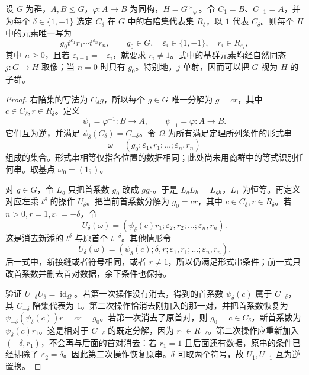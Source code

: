\begin{theorem}\label{b1:thm:hnn-normal-form}
	设 \(G\) 为群，\(A,B\le G\)，\(\varphi:A\rightarrow B\) 为同构，\(H=G*_{\varphi}\)。令 \(C_{1}=B\)、\(C_{-1}=A\)，并为每个 \(\delta\in\{1,-1\}\) 选定 \(C_\delta\) 在 \(G\) 中的右陪集代表集 \(R_\delta\)，以 \(1\) 代表 \(C_\delta\)。则每个 \(H\) 中的元素唯一写为
	\[
		g_0t^{\varepsilon_1}r_1\cdots t^{\varepsilon_n}r_n,
		\qquad g_0\in G,\quad\varepsilon_i\in\{1,-1\},\quad r_i\in R_{\varepsilon_i},
	\]
	其中 \(n\ge0\)，且若 \(\varepsilon_{i+1}=-\varepsilon_i\)，就要求 \(r_i\ne1\)。式中的基群元素均经自然同态 \(j:G\rightarrow H\) 取像；当 \(n=0\) 时只有 \(g_0\)。特别地，\(j\) 单射，因而可以把 \(G\) 视为 \(H\) 的子群。
\end{theorem}
\begin{proof}
	右陪集的写法为 \(C_\delta g\)，所以每个 \(g\in G\) 唯一分解为 \(g=cr\)，其中 \(c\in C_\delta,r\in R_\delta\)。定义
	\[
		\psi_1=\varphi^{-1}:B\longrightarrow A,\qquad
		\psi_{-1}=\varphi:A\longrightarrow B.
	\]
	它们互为逆，并满足 \(\psi_\delta(C_\delta)=C_{-\delta}\)。令 \(\Omega\) 为所有满足定理所列条件的形式串
	\[
		\omega=(g_0;\varepsilon_1,r_1;\ldots;\varepsilon_n,r_n)
	\]
	组成的集合。形式串相等仅指各位置的数据相同；此处尚未用商群中的等式识别任何串。取基点 \(\omega_0=(1;)\)。

	对 \(g\in G\)，令 \(L_g\) 只把首系数 \(g_0\) 改成 \(gg_0\)。于是 \(L_gL_h=L_{gh}\)，\(L_1\) 为恒等。再定义对应左乘 \(t^\delta\) 的操作 \(U_\delta\)。把当前首系数分解为 \(g_0=cr\)，其中 \(c\in C_\delta,r\in R_\delta\)。若 \(n>0,r=1,\varepsilon_1=-\delta\)，令
	\[
		U_\delta(\omega)
		=(\psi_\delta(c)r_1;\varepsilon_2,r_2;\ldots;\varepsilon_n,r_n).
	\]
	这是消去新添的 \(t^\delta\) 与原首个 \(t^{-\delta}\)。其他情形令
	\[
		U_\delta(\omega)
		=(\psi_\delta(c);\delta,r;\varepsilon_1,r_1;\ldots;\varepsilon_n,r_n).
	\]
	后一式中，新接缝或者符号相同，或者 \(r\ne1\)，所以仍满足形式串条件；前一式只改首系数并删去首对数据，余下条件也保持。

	验证 \(U_{-\delta}U_\delta=\operatorname{id}_\Omega\)。若第一次操作没有消去，得到的首系数 \(\psi_\delta(c)\) 属于 \(C_{-\delta}\)，其 \(C_{-\delta}\) 陪集代表为 \(1\)。第二次操作恰消去刚加入的那一对，并把首系数恢复为 \(\psi_{-\delta}(\psi_\delta(c))r=cr=g_0\)。若第一次消去了原首对，则 \(g_0=c\in C_\delta\)，新首系数为 \(\psi_\delta(c)r_1\)。这是相对于 \(C_{-\delta}\) 的既定分解，因为 \(r_1\in R_{-\delta}\)。第二次操作应重新加入 \((-\delta,r_1)\)，不会再与后面的首对消去：若 \(r_1=1\) 且后面还有数据，原串的条件已经排除了 \(\varepsilon_2=\delta\)。因此第二次操作恢复原串。\(\delta\) 可取两个符号，故 \(U_1,U_{-1}\) 互为逆置换。


\end{proof}
